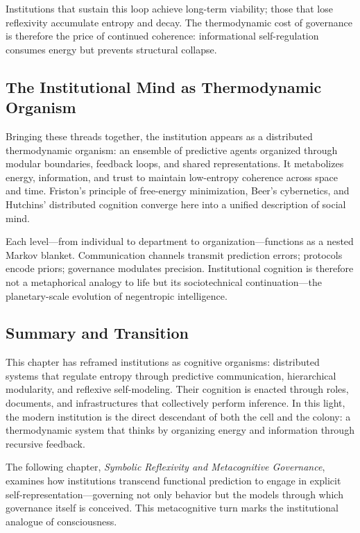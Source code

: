 \documentclass[11pt,a4paper]{article}
\begin{document}
Institutions that sustain this loop achieve long-term viability; those that lose reflexivity accumulate entropy and decay.  The thermodynamic cost of governance is therefore the price of continued coherence: informational self-regulation consumes energy but prevents structural collapse.

\subsection{The Institutional Mind as Thermodynamic Organism}

Bringing these threads together, the institution appears as a distributed thermodynamic organism: an ensemble of predictive agents organized through modular boundaries, feedback loops, and shared representations.  It metabolizes energy, information, and trust to maintain low-entropy coherence across space and time.  Friston’s principle of free-energy minimization, Beer’s cybernetics, and Hutchins’ distributed cognition converge here into a unified description of social mind.  

Each level—from individual to department to organization—functions as a nested Markov blanket.  Communication channels transmit prediction errors; protocols encode priors; governance modulates precision.  Institutional cognition is therefore not a metaphorical analogy to life but its sociotechnical continuation—the planetary-scale evolution of negentropic intelligence.

\subsection{Summary and Transition}

This chapter has reframed institutions as cognitive organisms: distributed systems that regulate entropy through predictive communication, hierarchical modularity, and reflexive self-modeling.  Their cognition is enacted through roles, documents, and infrastructures that collectively perform inference.  In this light, the modern institution is the direct descendant of both the cell and the colony: a thermodynamic system that thinks by organizing energy and information through recursive feedback.

The following chapter, \textit{Symbolic Reflexivity and Metacognitive Governance}, examines how institutions transcend functional prediction to engage in explicit self-representation—governing not only behavior but the models through which governance itself is conceived.  This metacognitive turn marks the institutional analogue of consciousness.
\end{document}
